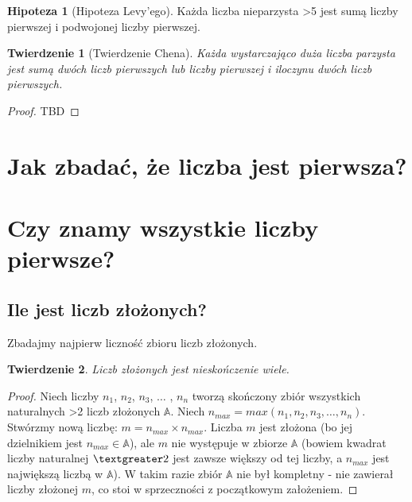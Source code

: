 \documentclass[10pt,onecolumn]{article}
\newtheorem{theorem}{Twierdzenie}
\theoremstyle{definition}
\theoremstyle{hypothesis}
\newtheorem{hypothesis}{Hipoteza}
\theoremstyle{capability}
\begin{document}
\begin{hypothesis}[Hipoteza Levy'ego]
Każda liczba nieparzysta \textgreater 5 jest sumą liczby pierwszej i podwojonej liczby pierwszej.
\label{Levy_hyp}
\end{hypothesis}

\begin{theorem}[Twierdzenie Chena]
Każda wystarczająco duża liczba parzysta jest sumą dwóch liczb pierwszych lub liczby pierwszej i iloczynu dwóch liczb pierwszych.
\end{theorem}
\begin{proof}
TBD
\end{proof}

\newpage


\section{Jak zbadać, że liczba jest pierwsza?}

\newpage


\newpage

\section{Czy znamy wszystkie liczby pierwsze?}

\subsection{Ile jest liczb złożonych?}

Zbadajmy najpierw liczność zbioru liczb złożonych.

\begin{theorem}
Liczb złożonych jest nieskończenie wiele.
\end{theorem}
 
\begin{proof}
 Niech liczby $n_1$, $n_2$, $n_3$, $\ldots$ , $n_n$ tworzą skończony zbiór wszystkich naturalnych \textgreater 2 liczb złożonych $\mathbb{A}$. Niech $n_{max} = max (n_1, n_2, n_3, \ldots, n_n)$. Stwórzmy nową liczbę: $m = n_{max} \times n_{max}$. Liczba $m$ jest złożona (bo jej dzielnikiem jest $n_{max} \in \mathbb{A}$), ale $m$ nie występuje w zbiorze $\mathbb{A}$ (bowiem kwadrat liczby naturalnej $\textgreater 2$ jest zawsze większy od tej liczby, a $n_{max}$ jest największą liczbą w $\mathbb{A}$). W takim razie zbiór $\mathbb{A}$ nie był kompletny - nie zawierał liczby złożonej $m$, co stoi w sprzeczności z początkowym założeniem.
\end{proof}
\end{document}
